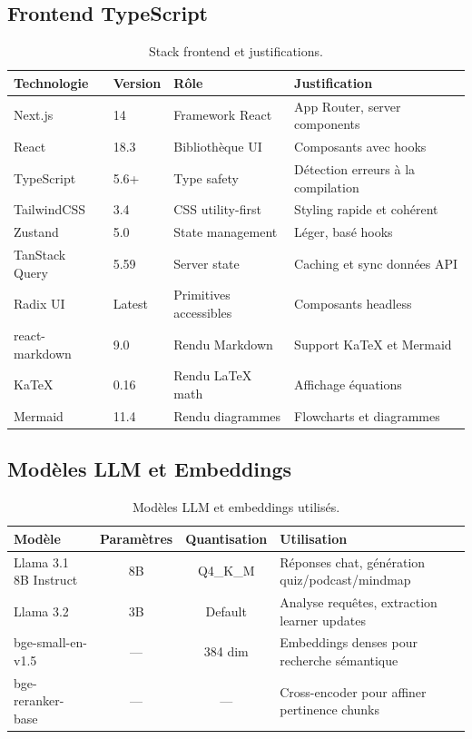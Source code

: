 \documentclass[12pt,a4paper]{article}
\begin{document}
\subsection{Frontend TypeScript}

\begin{table}[H]
    \centering
    \small
    \begin{tabularx}{\textwidth}{@{}llXl@{}}
        \toprule
        \textbf{Technologie} & \textbf{Version} & \textbf{Rôle} & \textbf{Justification} \\
        \midrule
        Next.js & 14 & Framework React & App Router, server components \\
        React & 18.3 & Bibliothèque UI & Composants avec hooks \\
        TypeScript & 5.6+ & Type safety & Détection erreurs à la compilation \\
        TailwindCSS & 3.4 & CSS utility-first & Styling rapide et cohérent \\
        Zustand & 5.0 & State management & Léger, basé hooks \\
        TanStack Query & 5.59 & Server state & Caching et sync données API \\
        Radix UI & Latest & Primitives accessibles & Composants headless \\
        react-markdown & 9.0 & Rendu Markdown & Support KaTeX et Mermaid \\
        KaTeX & 0.16 & Rendu LaTeX math & Affichage équations \\
        Mermaid & 11.4 & Rendu diagrammes & Flowcharts et diagrammes \\
        \bottomrule
    \end{tabularx}
    \caption{Stack frontend et justifications.}
\end{table}

\subsection{Modèles LLM et Embeddings}

\begin{table}[H]
    \centering
    \begin{tabularx}{\textwidth}{@{}lccX@{}}
        \toprule
        \textbf{Modèle} & \textbf{Paramètres} & \textbf{Quantisation} & \textbf{Utilisation} \\
        \midrule
        Llama 3.1 8B Instruct & 8B & Q4\_K\_M & Réponses chat, génération quiz/podcast/mindmap \\
        Llama 3.2 & 3B & Default & Analyse requêtes, extraction learner updates \\
        \addlinespace
        bge-small-en-v1.5 & --- & 384 dim & Embeddings denses pour recherche sémantique \\
        bge-reranker-base & --- & --- & Cross-encoder pour affiner pertinence chunks \\
        \bottomrule
    \end{tabularx}
    \caption{Modèles LLM et embeddings utilisés.}
\end{table}
\end{document}
